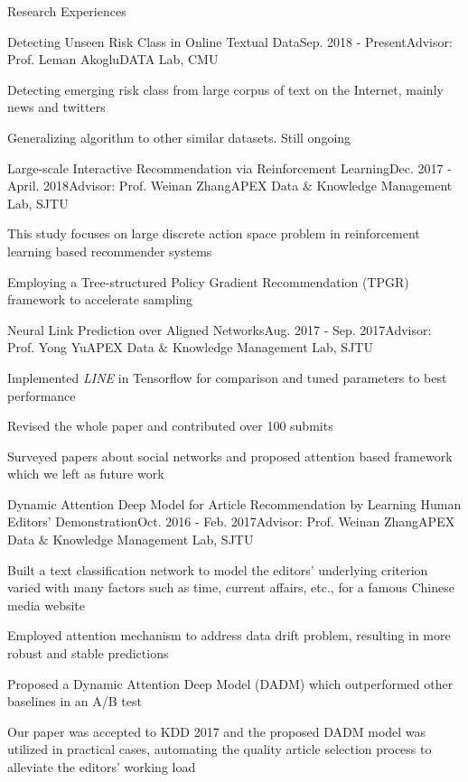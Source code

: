 \documentclass{resume} %
\begin{document}
\begin{rSection}{Research Experiences}
\begin{rSubsection}{Detecting Unseen Risk Class in Online Textual Data}{Sep. 2018 - Present}{Advisor: Prof. Leman Akoglu}{DATA Lab, CMU}
\item Detecting emerging risk class from large corpus of text on the Internet, mainly news and twitters
\item Generalizing algorithm to other similar datasets. Still ongoing
\end{rSubsection}
\newpage
\begin{rSubsection}{Large-scale Interactive Recommendation via Reinforcement Learning}{Dec. 2017 - April. 2018}{Advisor: Prof. Weinan Zhang}{APEX Data $\&$ Knowledge Management Lab, SJTU}
\item This study focuses on large discrete action space problem in reinforcement learning based recommender systems
\item Employing a Tree-structured Policy Gradient Recommendation (TPGR) framework to accelerate sampling
\end{rSubsection}
\begin{rSubsection}{Neural Link Prediction over Aligned Networks}{Aug. 2017 - Sep. 2017}{Advisor: Prof. Yong Yu}{APEX Data $\&$ Knowledge Management Lab, SJTU}
\item Implemented \emph{LINE} in Tensorflow for comparison and tuned parameters to best performance
\item Revised the whole paper and contributed over 100 submits 
\item Surveyed papers about social networks and proposed attention based framework which we left as future work
\end{rSubsection}

\begin{rSubsection}{Dynamic Attention Deep Model for Article Recommendation
by Learning Human Editors’ Demonstration}{Oct. 2016 - Feb. 2017}{Advisor: Prof. Weinan Zhang}{APEX Data $\&$ Knowledge Management Lab, SJTU}
\item Built a text classification network to model the editors' underlying criterion varied with many factors such as time, current affairs, etc., for a famous Chinese media website
\item Employed attention mechanism to address data drift problem, resulting in more robust and stable predictions
\item Proposed a Dynamic Attention Deep Model (DADM) which outperformed other baselines in an A/B test
\item Our paper was accepted to KDD 2017 and the proposed DADM model was utilized in practical cases, automating the quality article selection process to alleviate the editors' working load\\\\
\end{rSubsection}
\end{rSection}
\end{document}
